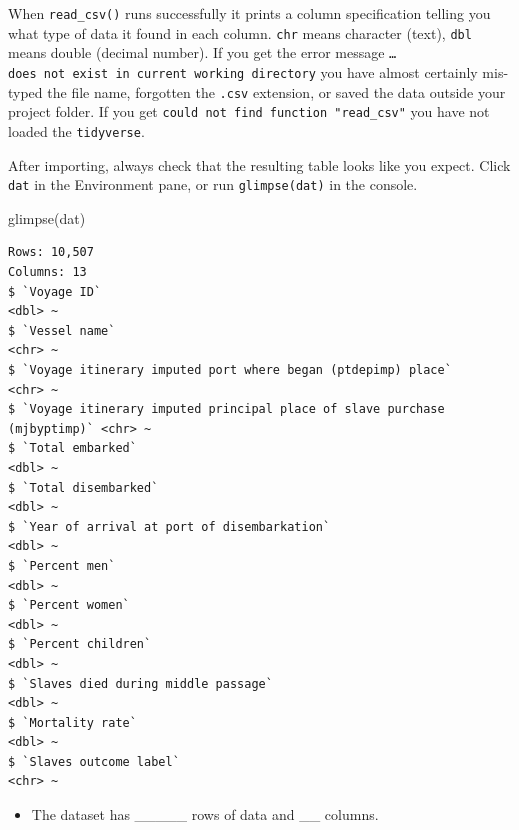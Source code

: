 \documentclass[
  english,
  letterpaper,
]{book}
\newenvironment{Shaded}{\begin{snugshade}}{\end{snugshade}}
\newcommand{\FunctionTok}[1]{\textcolor[rgb]{0.28,0.35,0.67}{#1}}
\newcommand{\NormalTok}[1]{\textcolor[rgb]{0.00,0.23,0.31}{#1}}
\providecommand{\tightlist}{%
  \setlength{\itemsep}{0pt}\setlength{\parskip}{0pt}}
\begin{document}
When \texttt{read\_csv()} runs successfully it prints a column
specification telling you what type of data it found in each column.
\texttt{chr} means character (text), \texttt{dbl} means double (decimal
number). If you get the error message
\texttt{…does\ not\ exist\ in\ current\ working\ directory} you have
almost certainly mis-typed the file name, forgotten the \texttt{.csv}
extension, or saved the data outside your project folder. If you get
\texttt{could\ not\ find\ function\ "read\_csv"} you have not loaded the
\texttt{tidyverse}.

After importing, always check that the resulting table looks like you
expect. Click \texttt{dat} in the Environment pane, or run
\texttt{glimpse(dat)} in the console.

\begin{Shaded}
\begin{Highlighting}[]
\FunctionTok{glimpse}\NormalTok{(dat)}
\end{Highlighting}
\end{Shaded}

\begin{verbatim}
Rows: 10,507
Columns: 13
$ `Voyage ID`                                                              <dbl> ~
$ `Vessel name`                                                            <chr> ~
$ `Voyage itinerary imputed port where began (ptdepimp) place`             <chr> ~
$ `Voyage itinerary imputed principal place of slave purchase (mjbyptimp)` <chr> ~
$ `Total embarked`                                                         <dbl> ~
$ `Total disembarked`                                                      <dbl> ~
$ `Year of arrival at port of disembarkation`                              <dbl> ~
$ `Percent men`                                                            <dbl> ~
$ `Percent women`                                                          <dbl> ~
$ `Percent children`                                                       <dbl> ~
$ `Slaves died during middle passage`                                      <dbl> ~
$ `Mortality rate`                                                         <dbl> ~
$ `Slaves outcome label`                                                   <chr> ~
\end{verbatim}

\begin{itemize}
\tightlist
\item
  The dataset has \_\_\_\_\_ rows of data and \_\_ columns.
\end{itemize}
\end{document}
